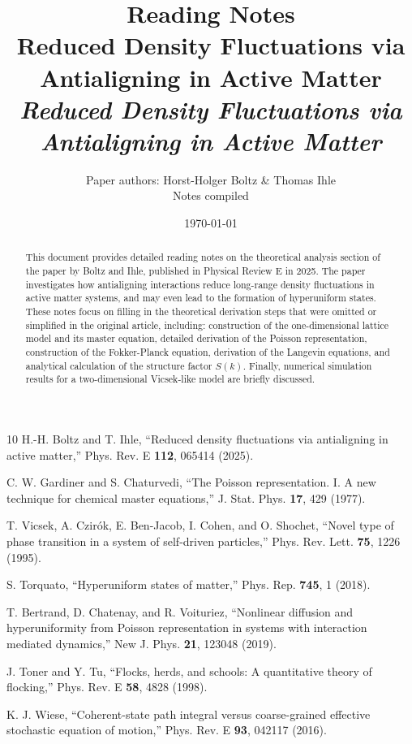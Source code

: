 \documentclass[a4paper,10pt]{article}
\title{
    \vspace{-1cm}
    {\Large Reading Notes}\\[0.5em]
    {\LARGE\bfseries Reduced Density Fluctuations via Antialigning in Active Matter}\\[0.3em]
    {\large\itshape Reduced Density Fluctuations via Antialigning in Active Matter}
}
\author{
    Paper authors: Horst-Holger Boltz \& Thomas Ihle\\
    Notes compiled
}
\date{\today}
\theoremstyle{definition}
\theoremstyle{remark}
\begin{document}
\maketitle
\thispagestyle{fancy}

\begin{abstract}
\noindent
This document provides detailed reading notes on the theoretical analysis section of the paper by Boltz and Ihle, published in Physical Review E in 2025\cite{boltz2025}. The paper investigates how antialigning interactions reduce long-range density fluctuations in active matter systems, and may even lead to the formation of hyperuniform states. These notes focus on filling in the theoretical derivation steps that were omitted or simplified in the original article, including: construction of the one-dimensional lattice model and its master equation, detailed derivation of the Poisson representation, construction of the Fokker-Planck equation, derivation of the Langevin equations, and analytical calculation of the structure factor $S(k)$. Finally, numerical simulation results for a two-dimensional Vicsek-like model are briefly discussed.
\end{abstract}

\tableofcontents
\newpage








\begin{thebibliography}{10}
H.-H. Boltz and T. Ihle,
``Reduced density fluctuations via antialigning in active matter,''
Phys. Rev. E \textbf{112}, 065414 (2025).

C. W. Gardiner and S. Chaturvedi,
``The Poisson representation. I. A new technique for chemical master equations,''
J. Stat. Phys. \textbf{17}, 429 (1977).

T. Vicsek, A. Czir\'{o}k, E. Ben-Jacob, I. Cohen, and O. Shochet,
``Novel type of phase transition in a system of self-driven particles,''
Phys. Rev. Lett. \textbf{75}, 1226 (1995).

S. Torquato,
``Hyperuniform states of matter,''
Phys. Rep. \textbf{745}, 1 (2018).

T. Bertrand, D. Chatenay, and R. Voituriez,
``Nonlinear diffusion and hyperuniformity from Poisson representation in systems with interaction mediated dynamics,''
New J. Phys. \textbf{21}, 123048 (2019).

J. Toner and Y. Tu,
``Flocks, herds, and schools: A quantitative theory of flocking,''
Phys. Rev. E \textbf{58}, 4828 (1998).

K. J. Wiese,
``Coherent-state path integral versus coarse-grained effective stochastic equation of motion,''
Phys. Rev. E \textbf{93}, 042117 (2016).
\end{thebibliography}
\end{document}
